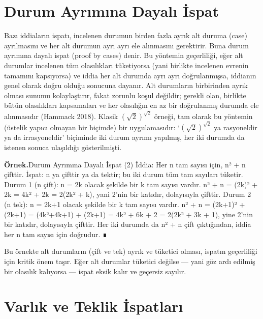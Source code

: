 \section{Durum Ayrımına Dayalı İspat}\label{sec:durum}

Bazı iddiaların ispatı, incelenen durumun birden fazla ayrık alt duruma (case) ayrılmasını ve her alt durumun ayrı ayrı ele alınmasını gerektirir. Buna durum ayrımına dayalı ispat (proof by cases) denir. Bu yöntemin geçerliliği, eğer alt durumlar incelenen tüm olasılıkları tüketiyorsa (yani birlikte incelenen evrenin tamamını kapsıyorsa) ve iddia her alt durumda ayrı ayrı doğrulanmışsa, iddianın genel olarak doğru olduğu sonucuna dayanır. Alt durumların birbirinden ayrık olması sunumu kolaylaştırır, fakat zorunlu koşul değildir; gerekli olan, birlikte bütün olasılıkları kapsamaları ve her olasılığın en az bir doğrulanmış durumda ele alınmasıdır (Hammack 2018). Klasik $(\sqrt2)^{\sqrt2}$ örneği, tam olarak bu yöntemin (üstelik yapıcı olmayan bir biçimde) bir uygulamasıdır: ‘$(\sqrt2)^{\sqrt2}$ ya rasyoneldir ya da irrasyoneldir’ biçiminde iki durum ayrımı yapılmış, her iki durumda da istenen sonuca ulaşıldığı gösterilmişti.

\begin{tcolorbox}[bookbox,colback=cEx]\textbf{\textsf{\textcolor{cAcc}{Örnek.}}}\quad Durum Ayrımına Dayalı İspat (2) İddia: Her n tam sayısı için, n² + n çifttir. İspat: n ya çifttir ya da tektir; bu iki durum tüm tam sayıları tüketir. Durum 1 (n çift): n = 2k olacak şekilde bir k tam sayısı vardır. n² + n = (2k)² + 2k = 4k² + 2k = 2(2k² + k), yani 2’nin bir katıdır, dolayısıyla çifttir. Durum 2 (n tek): n = 2k+1 olacak şekilde bir k tam sayısı vardır. n² + n = (2k+1)² + (2k+1) = (4k²+4k+1) + (2k+1) = 4k² + 6k + 2 = 2(2k² + 3k + 1), yine 2’nin bir katıdır, dolayısıyla çifttir. Her iki durumda da n² + n çift çıktığından, iddia her n tam sayısı için doğrudur. ∎\end{tcolorbox}

Bu örnekte alt durumların (çift ve tek) ayrık ve tüketici olması, ispatın geçerliliği için kritik önem taşır. Eğer alt durumlar tüketici değilse — yani göz ardı edilmiş bir olasılık kalıyorsa — ispat eksik kalır ve geçersiz sayılır.

\section{Varlık ve Teklik İspatları}

